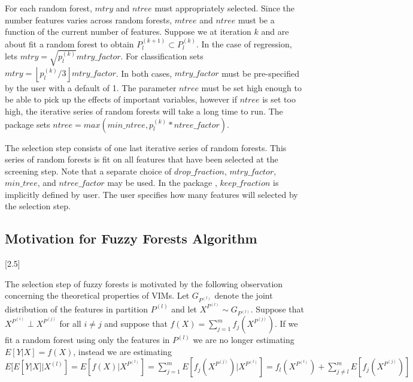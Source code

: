 \documentclass[article,shortnames]{jss}
\begin{document}
For each random forest, $mtry$ and $ntree$ must appropriately selected.  Since the number features varies across random forests, $mtree$
and $ntree$ must be a function of the current number of features.   Suppose we at iteration $k$ and are about fit a random forest to obtain
$P_{l}^{(k+1)}\subset P_{l}^{(k)}$.  In the case of regression,  lets $mtry=\sqrt{p^{(k)}_{l}}mtry\_factor$.  For classification 
 sets $mtry=\left\lfloor p^{(k)}_{l}/3 \right\rfloor mtry\_factor$.  In both cases, $mtry\_factor$ must be pre-specified by the user
with a default of 1.  The parameter $ntree$ must be set high enough to be able to pick up the effects
of important variables, however if $ntree$ is set too high, the iterative series of random forests will take a long time to run.  The package  sets $ntree=max(min\_ntree,p^{(k)}_{l}*ntree\_factor)$.
   
The selection step consists of one last iterative series of random forests. This series of random forests is fit on all features that have
been selected at the screening step.  Note that a separate choice of $drop\_fraction$, $mtry\_factor$, $min\_tree$,
and $ntree\_factor$ may be used.  In the package , $keep\_fraction$ is implicitly defined by user.  The user specifies 
how many features will selected by the selection step.  

\subsection{Motivation for Fuzzy Forests Algorithm}[2.5]

The selection step of fuzzy forests is motivated by the following observation concerning the theoretical properties of VIMs. 
Let $G_{P^{(l)}}$ denote the joint distribution of the features in partition $P^{(l)}$ and let $X^{P^{(l)}} \sim G_{P^{(l)}}$.
Suppose that $X^{P^{(i)}} \perp X^{P^{(j)}}$ for all $i\neq j$ and suppose that $f(X)=\sum_{j=1}^{m}f_{j}(X^{P^{(j)}})$.  If we fit
a random forest using only the features in $P^{(l)}$ we are no longer estimating $E[Y|X]=f(X)$, instead we are estimating
 $E[E[Y|X]|X^{(l)}]=E[f(X)|X^{P^{(l)}}]=\sum_{j=1}^{m}E[f_{j}(X^{P^{(j)}})|X^{P^{(l)}}]=f_{l}(X^{P^{(l)}}) + \sum_{j\neq l}^{m}E[f_{j}(X^{P^{(j)}})]$
\end{document}
